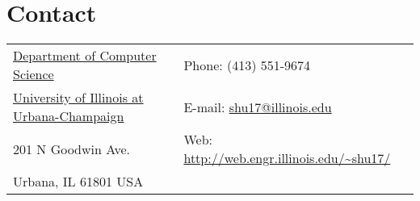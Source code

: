 \section{\sc Contact}
\vspace{.05in}
\begin{tabular}{@{}p{3in}p{4in}}
{\href{http://www.cs.illinois.edu/}{Department of Computer Science}}                     & {Phone:}  (413) 551-9674 \\
{\href{http://www.illinois.edu/}{University of Illinois at Urbana-Champaign}}            & {E-mail:} {\href{mailto:shu17@illinois.edu}{shu17@illinois.edu}}\\
201 N Goodwin Ave.                                                                                 & {Web:} {\url{http://web.engr.illinois.edu/~shu17/}}\\
Urbana, IL 61801 USA
\end{tabular}



